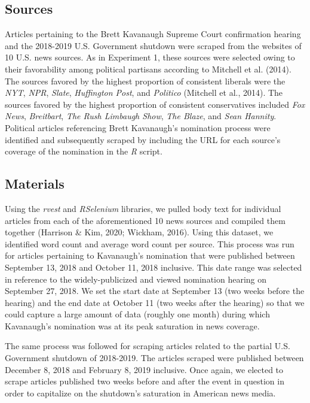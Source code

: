 \documentclass[
  english,
  man]{apa6}
\begin{document}
\hypertarget{sources-1}{%
\subsection{Sources}\label{sources-1}}

Articles pertaining to the Brett Kavanaugh Supreme Court confirmation hearing and the 2018-2019 U.S. Government shutdown were scraped from the websites of 10 U.S. news sources. As in Experiment 1, these sources were selected owing to their favorability among political partisans according to Mitchell et al. (2014). The sources favored by the highest proportion of consistent liberals were the \emph{NYT}, \emph{NPR}, \emph{Slate}, \emph{Huffington Post}, and \emph{Politico} (Mitchell et al., 2014). The sources favored by the highest proportion of consistent conservatives included \emph{Fox News}, \emph{Breitbart}, \emph{The Rush Limbaugh Show}, \emph{The Blaze}, and \emph{Sean Hannity}. Political articles referencing Brett Kavanaugh's nomination process were identified and subsequently scraped by including the URL for each source's coverage of the nomination in the \emph{R} script.

\hypertarget{materials-1}{%
\subsection{Materials}\label{materials-1}}

Using the \emph{rvest} and \emph{RSelenium} libraries, we pulled body text for individual articles from each of the aforementioned 10 news sources and compiled them together (Harrison \& Kim, 2020; Wickham, 2016). Using this dataset, we identified word count and average word count per source. This process was run for articles pertaining to Kavanaugh's nomination that were published between September 13, 2018 and October 11, 2018 inclusive. This date range was selected in reference to the widely-publicized and viewed nomination hearing on September 27, 2018. We set the start date at September 13 (two weeks before the hearing) and the end date at October 11 (two weeks after the hearing) so that we could capture a large amount of data (roughly one month) during which Kavanaugh's nomination was at its peak saturation in news coverage.

The same process was followed for scraping articles related to the partial U.S. Government shutdown of 2018-2019. The articles scraped were published between December 8, 2018 and February 8, 2019 inclusive. Once again, we elected to scrape articles published two weeks before and after the event in question in order to capitalize on the shutdown's saturation in American news media.
\end{document}
